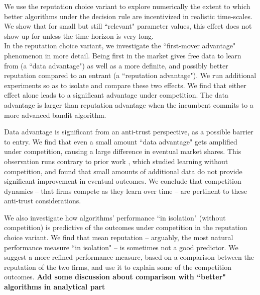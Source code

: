 We use the reputation choice variant to explore numerically the extent to which better algorithms under the \HardMaxRandom decision rule are incentivized in realistic time-scales. We show that for small but still ``relevant" parameter values, this effect does not show up for unless the time horizon is very long. \\
In the reputation choice variant, we investigate the ``first-mover advantage" phenomenon in more detail. Being first in the market gives free data to learn from (a ``data advantage") as well as a more definite, and possibly better reputation compared to an entrant (a ``reputation advantage"). We run additional experiments so as to isolate and compare these two effects. We find that either effect alone leads to a significant advantage under competition. The data advantage is larger than reputation advantage when the incumbent commits to a more advanced bandit algorithm.

Data advantage is significant from an anti-trust perspective, as a possible barrier to entry. We find that even a small amount ``data advantage" gets amplified under competition, causing a large difference in eventual market shares. This observation runs contrary to prior work  \cite{lambrecht2015can,bajari2018impact}, which studied learning without competition, and found that small amounts of additional data do not provide significant improvement in eventual outcomes. We conclude that competition dynamics -- that firms compete as they learn over time -- are pertinent to these anti-trust considerations.

 We also investigate how algorithms' performance ``in isolation" (without competition) is predictive of the outcomes under competition in the reputation choice variant. We find that mean reputation -- arguably, the most natural performance measure ``in isolation" -- is sometimes not a good predictor. We suggest a more refined performance measure, based on a comparison between the reputation of the two firms, and use it to explain some of the competition outcomes.
\textbf{Add some discussion about comparison with ``better" algorithms in analytical part}


